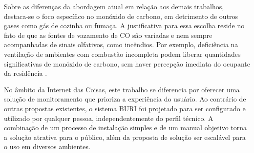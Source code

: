 Sobre as diferenças da abordagem atual em relação aos demais trabalhos, destaca-se o foco específico no monóxido de carbono, em detrimento de outros gases 
como gás de cozinha ou fumaça. A justificativa para essa escolha reside no fato de que as fontes de vazamento de CO são variadas e nem sempre acompanhadas de sinais 
olfativos, como incêndios. Por exemplo, deficiência na ventilação de ambientes com combustão incompleta podem liberar quantidades significativas de monóxido de carbono, sem haver percepção imediata do ocupante da residência \cite{carbon-monoxide-poisoning-varon}.

No âmbito da Internet das Coisas, este trabalho se diferencia por oferecer uma solução de monitoramento que prioriza a experiência do usuário. Ao contrário de outras propostas existentes, o sistema BURI foi projetado para ser 
configurado e utilizado por qualquer pessoa, independentemente do perfil técnico. A combinação de um processo de instalação simples e de um manual objetivo torna a solução atrativa para o público, além da proposta de solução 
ser escalável para o uso em diversos ambientes. 